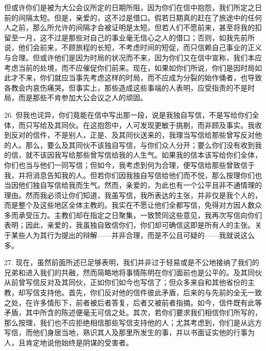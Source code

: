 但或许你们是被为大公会议所定的日期所阻，因为你们在信中抱怨，我们所定之日前的间隔太短。但是，亲爱的，这不过是借口。假若日期真的赶在了旅途中的任何人之前，那么所允许的间隔才会被证明是太短。但若人们不愿前来，甚至将我的扣留至一月，这不过是那些对自己的事业毫无信心之人的借口；否则，如我先前所说，他们会前来，不顾旅程的长短，不考虑时间的短促，而只信赖自己事业的正义与合理。但或许他们是因为时局的状况而不来，因为你们又在信中宣称，我们本应考虑当前的处境，而不应催促你们前来。现在，如果如你们所说，你们是因时局如此才不来，你们就应当事先考虑这样的时局，而不应成为分裂的始作俑者，也导致各教会内哀伤痛哭。但事实上，那些造成这些事端的人表明，应受指责的不是时局，而是那些不肯参加大公会议之人的顽固。\par

26. 但我也诧异，你们竟能在信中写出那一段，说是我独自写信，不是写给你们全体，而只写给及其同伙。在这抱怨中，人可发现更敏于挑剔，而非顾及事实。我收到反对的信件，不是别人，正是、及其同伙送来的，我理当写信给那些曾写反对他的人。那么，要么及其同伙不该独自写信，与你们众人分开；要么你们没有收到我的信，就不该因我写给那些曾写信给我的人生气。如果我的信本该写给你们全体，你们也当与他们一同写信；但如今，我考虑到何为合理，便写信给那些曾致信于我，并将消息告知我的人。但若你们因我独自写信给他们而不悦，那么按理你们也当因他们独自写信给我而生气。然而，亲爱的，为此也有一个公平且非不通情理的理由。然而我必须让你们知道，我虽写信，我所表达的主张，并非仅是我个人的，而是整个及这些地区全体主教的。我实在不愿让他们全都写信，免得对方因人数众多而承受压力。主教们却在指定之日聚集，一致赞同这些意见，我再次写信向你们表明；因此，亲爱的，我虽独自致信你们，你们却可确信这即是所有人的主张。关于某些人为其行为提出的辩解——并非合理，而是不公且可疑的——我就说这么多。\par

27. 现在，虽然前面所述已足够表明，我们并非过于轻易或是不公地接纳了我们的兄弟和进入我们的共融，然而简略地将事情陈明在你们面前也是公平的。及其同伙从前曾写信反对及其同伙，正如你们如今也写信了；但众多来自和其他省份的主教，却写信支持他。首先，你们反对他的信件彼此矛盾，后来的与先前的全无一致之处，在许多情形下，前者被后者答复，后者又被前者指摘。如今，信件既有此等矛盾，其中所含的陈述便毫无可信之处。其次，若你们要求我们相信你们所写的，那么按理，我们也不应拒绝相信那些写信支持他的人；尤其考虑到，你们是从远方写信，而他们身居当地，熟识其人及那里所发生的事，并以书面证实他的行事为人，且肯定地说他始终是阴谋的受害者。\par

